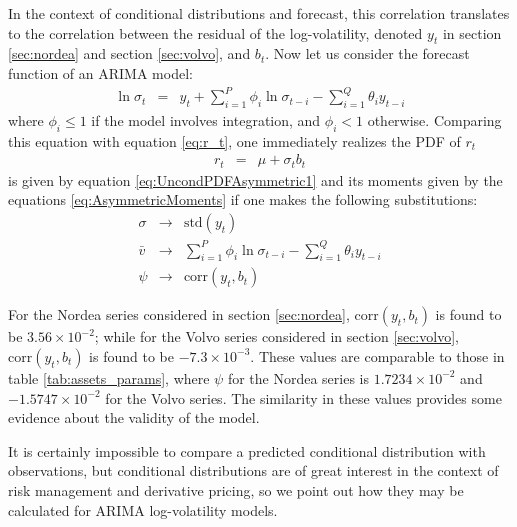 In the context of conditional distributions and forecast, this
correlation translates to the correlation between the residual of the
log-volatility, denoted $y_t$ in section \ref{sec:nordea} and
section \ref{sec:volvo}, and $b_t$. Now let us consider the forecast
function of an ARIMA model:
\begin{eqnarray*}
  \ln \sigma_t &=& y_t + \sum_{i=1}^P \phi_i \ln \sigma_{t-i} -
  \sum_{i=1}^Q \theta_i y_{t-i}
\end{eqnarray*}
where $\phi_i \leq 1$ if the model involves integration, and $\phi_i <
1$ otherwise. Comparing this equation with equation \ref{eq:r_t}, one
immediately realizes the PDF of $r_t$
\begin{eqnarray*}
  r_t &=& \mu + \sigma_t b_t
\end{eqnarray*}
is given by equation \ref{eq:UncondPDFAsymmetric1} and its moments
given by the equations \ref{eq:AsymmetricMoments} if one makes the
following substitutions:
\begin{eqnarray*}
  \sigma &\to& \text{std}(y_t) \\
  \bar{v} &\to& \sum_{i=1}^P \phi_i \ln \sigma_{t-i} - \sum_{i=1}^Q
  \theta_i y_{t-i} \\
  \psi &\to& \text{corr}(y_t, b_t)
\end{eqnarray*}

For the Nordea series considered in section \ref{sec:nordea},
$\text{corr}(y_t, b_t)$ is found to be $3.56 \times 10^{-2}$; while
for the Volvo series considered in section \ref{sec:volvo},
$\text{corr}(y_t, b_t)$ is found to be $-7.3 \times 10^{-3}$. These
values are comparable to those in table \ref{tab:assets_params}, where
$\psi$ for the Nordea series is $1.7234 \times 10^{-2}$ and $-1.5747
\times 10^{-2}$ for the Volvo series. The similarity in these values
provides some evidence about the validity of the model.

It is certainly impossible to compare a predicted conditional
distribution with observations, but conditional distributions are of
great interest in the context of risk management and derivative
pricing, so we point out how they may be calculated for ARIMA
log-volatility models.

